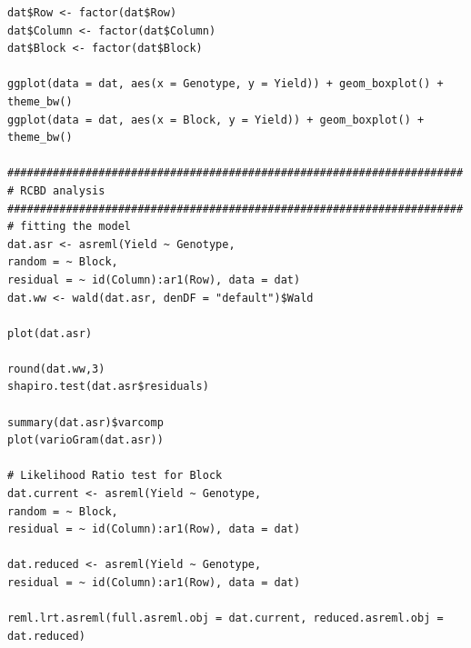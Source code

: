\documentclass[a4paper, 10pt, fleqn, twosided]{memoir}
\begin{document}
\begin{tcolorbox}[title = Exercise 16 code]
\begin{verbatim}
dat$Row <- factor(dat$Row)
dat$Column <- factor(dat$Column)
dat$Block <- factor(dat$Block)

ggplot(data = dat, aes(x = Genotype, y = Yield)) + geom_boxplot() +
theme_bw()
ggplot(data = dat, aes(x = Block, y = Yield)) + geom_boxplot() +
theme_bw()

######################################################################
# RCBD analysis
######################################################################
# fitting the model
dat.asr <- asreml(Yield ~ Genotype,
random = ~ Block,
residual = ~ id(Column):ar1(Row), data = dat)
dat.ww <- wald(dat.asr, denDF = "default")$Wald

plot(dat.asr)

round(dat.ww,3)
shapiro.test(dat.asr$residuals)

summary(dat.asr)$varcomp
plot(varioGram(dat.asr))

# Likelihood Ratio test for Block
dat.current <- asreml(Yield ~ Genotype,
random = ~ Block,
residual = ~ id(Column):ar1(Row), data = dat)

dat.reduced <- asreml(Yield ~ Genotype,
residual = ~ id(Column):ar1(Row), data = dat)

reml.lrt.asreml(full.asreml.obj = dat.current, reduced.asreml.obj = dat.reduced)

\end{verbatim}
\end{tcolorbox}
\end{document}
